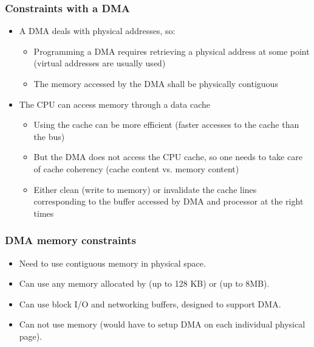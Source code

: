 \begin{frame}
  \frametitle{Constraints with a DMA}
  \begin{itemize}
  \item A DMA deals with physical addresses, so:
    \begin{itemize}
    \item Programming a DMA requires retrieving a physical address at
      some point (virtual addresses are usually used)
    \item The memory accessed by the DMA shall be physically
      contiguous
    \end{itemize}
  \item The CPU can access memory through a data cache
    \begin{itemize}
    \item Using the cache can be more efficient (faster accesses to
      the cache than the bus)
    \item But the DMA does not access the CPU cache, so one needs to
      take care of cache coherency (cache content vs. memory content)
    \item Either clean (write to memory) or invalidate the cache lines corresponding to
      the buffer accessed by DMA and processor at the right times
    \end{itemize}
  \end{itemize}
\end{frame}

\begin{frame}
  \frametitle{DMA memory constraints}
  \begin{itemize}
  \item Need to use contiguous memory in physical space.
  \item Can use any memory allocated by  (up to 128 KB)
    or  (up to 8MB).
  \item Can use block I/O and networking buffers, designed to support
    DMA.
  \item Can not use  memory (would have to setup DMA on each
    individual physical page).
  \end{itemize}
\end{frame}

